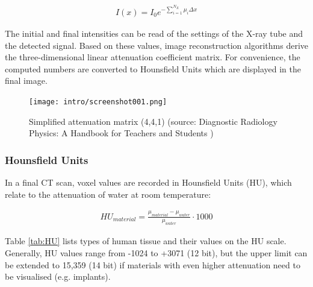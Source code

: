 \begin{align}
\label{eq:mu_sum}
I(x) = I_0 e^{- \sum\limits_{i=1}^{N_X} \mu_i \Delta x}
\end{align}

The initial and final intensities can be read of the settings of the X-ray tube and the detected signal.
Based on these values, image reconstruction algorithms derive the three-dimensional linear attenuation coefficient matrix.
For convenience, the computed numbers are converted to Hounsfield Units which are displayed in the final image. \cite{Podgorsak, Maidment2014}

\begin{figure}[!htb]
	\centering
	\texttt{[image: intro/screenshot001.png]}
	\caption{Simplified attenuation matrix (4,4,1) (source: Diagnostic Radiology Physics: A Handbook for Teachers and Students \cite{Maidment2014})}
	\label{fig:voxel_matrix}
\end{figure}

\subsubsection{Hounsfield Units}

In a final CT scan, voxel values are recorded in Hounsfield Units (HU), which relate to the attenuation of water at room temperature:

\begin{align}
HU_{material} = \frac{\mu_{material} - \mu_{water}}{\mu_{water}} \cdot 1000
\end{align}

Table \ref{tab:HU} lists types of human tissue and their values on the HU scale.
Generally, HU values range from -1024 to +3071 (12 bit), but the upper limit can be extended to 15,359 (14 bit) if materials with even higher attenuation need to be visualised (e.g. implants).

